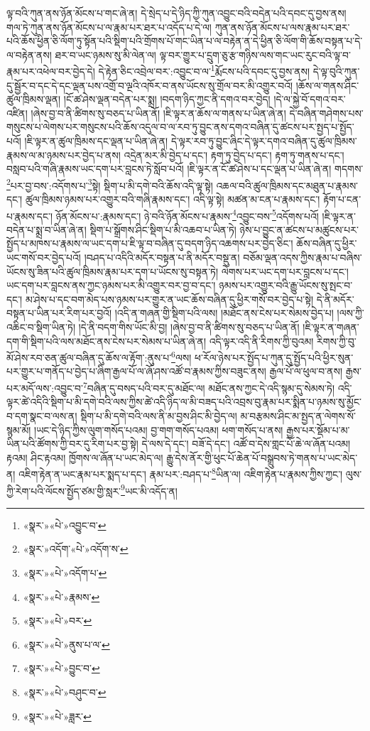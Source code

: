 ལྟ་བའི་ཀུན་ནས་ཉོན་མོངས་པ་གང་ཞེ་ན། དེ་སྲེད་པ་དེ་ཉིད་ཀྱི་ཀུན་འབྱུང་བའི་བདེན་པའི་དབང་དུ་བྱས་ནས། གལ་ཏེ་ཀུན་ནས་ཉོན་མོངས་པ་ལ་རྣམ་པར་ཐར་པ་འདོད་པ་དེ་ལ། ཀུན་ནས་ཉོན་མོངས་པ་ལས་རྣམ་པར་ཐར་པའི་ཆོས་ཕྱིན་ཅི་ལོག་ཏུ་སྟོན་པའི་སྡིག་པའི་གྲོགས་པོ་གང་ཡིན་པ་ལ་བརྟེན་ན་དེ་ཕྱིན་ཅི་ལོག་གི་ཆོས་བསྟན་པ་དེ་ལ་བརྟེན་ནས། ཐར་བ་ཡང་ཉམས་སུ་མི་ལེན་ལ། ལྟ་བར་གྱུར་པ་དྲུག་ཅུ་རྩ་གཉིས་ལས་གང་ཡང་རུང་བའི་ལྟ་བ་རྣམ་པར་འཕེལ་བར་བྱེད་དེ། དེ་རྟེན་ཅིང་འབྲེལ་བར་:འབྱུང་བ་ལ་\footnote{«སྣར་»«པེ་»འབྱུང་བ་}རྨོངས་པའི་དབང་དུ་བྱས་ནས། དེ་ལྟ་བུའི་ཀུན་དུ་སྦྱོར་བ་དང་དེ་དང་ལྡན་པས་འགྲོ་བ་ལྔའི་འཁོར་བ་ནས་ཡོངས་སུ་གྲོལ་བར་མི་འགྱུར་བའོ། །ཆོས་ལ་གནས་ཤིང་ཚུལ་ཁྲིམས་ལྡན། །ངོ་ཚ་ཤེས་ལྡན་བདེན་པར་སྨྲ། །བདག་ཉིད་ཀྱང་ནི་དགའ་བར་བྱེད། །དེ་ལ་སྐྱེ་བོ་དགའ་བར་འཛིན། །ཞེས་བྱ་བ་ནི་ཚིགས་སུ་བཅད་པ་ཡིན་ནོ། །ཇི་ལྟར་ན་ཆོས་ལ་གནས་པ་ཡིན་ཞེ་ན། དེ་བཞིན་གཤེགས་པས་གསུངས་པ་ལེགས་པར་གསུངས་པའི་ཆོས་འདུལ་བ་ལ་རབ་ཏུ་བྱུང་ནས་དགའ་བཞིན་དུ་ཚངས་པར་སྤྱད་པ་སྤྱོད་པའོ། །ཇི་ལྟར་ན་ཚུལ་ཁྲིམས་དང་ལྡན་པ་ཡིན་ཞེ་ན། དེ་ལྟར་རབ་ཏུ་བྱུང་ཞིང་དེ་ལྟར་དགའ་བཞིན་དུ་ཚུལ་ཁྲིམས་རྣམས་ལ་མ་ཉམས་པར་བྱེད་པ་ནས། འདྲེན་མར་མི་བྱེད་པ་དང་། རྟག་ཏུ་བྱེད་པ་དང་། རྟག་ཏུ་གནས་པ་དང་། བསླབ་པའི་གཞི་རྣམས་ཡང་དག་པར་བླངས་ཏེ་སློབ་པའོ། །ཇི་ལྟར་ན་ངོ་ཚ་ཤེས་པ་དང་ལྡན་པ་ཡིན་ཞེ་ན། གདགས་\footnote{«སྣར་»འདོག་«པེ་»འདོག་ས་}པར་བྱ་བས་:འདོགས་པ་\footnote{«སྣར་»«པེ་»འདོག་པ་}སྟེ། སྡིག་པ་མི་དགེ་བའི་ཆོས་འདི་ལྟ་སྟེ། འཆལ་བའི་ཚུལ་ཁྲིམས་དང་མཐུན་པ་རྣམས་དང་། ཚུལ་ཁྲིམས་ཉམས་པར་འགྱུར་བའི་གཞི་རྣམས་དང་། འདི་ལྟ་སྟེ། མཚན་མ་ངན་པ་རྣམས་དང་། རྟོག་པ་ངན་པ་རྣམས་དང་། ཉོན་མོངས་པ་:རྣམས་དང་། ཉེ་བའི་ཉོན་མོངས་པ་རྣམས་\footnote{«སྣར་»«པེ་»རྣམས་}འབྱུང་བས་\footnote{«སྣར་»«པེ་»བར་}འདོགས་པའོ། །ཇི་ལྟར་ན་བདེན་པ་སྨྲ་བ་ཡིན་ཞེ་ན། སྡིག་པ་སྒྲོགས་ཤིང་སྡིག་པ་མི་འཆབ་པ་ཡིན་ཏེ། ཉེས་པ་བྱུང་ན་ཚངས་པ་མཚུངས་པར་སྤྱོད་པ་མཁས་པ་རྣམས་ལ་ཡང་དག་པ་ཇི་ལྟ་བ་བཞིན་དུ་བདག་ཉིད་འཆགས་པར་བྱེད་ཅིང་། ཆོས་བཞིན་དུ་ཕྱིར་ཡང་གསོ་བར་བྱེད་པའོ། །བཤད་པ་འདིའི་མདོར་བསྟན་པ་ནི་མདོར་བསྡུ་ན། བཅོམ་ལྡན་འདས་ཀྱིས་རྣམ་པ་བཞིས་ཡོངས་སུ་ཟིན་པའི་ཚུལ་ཁྲིམས་རྣམ་པར་དག་པ་ཡོངས་སུ་བསྟན་ཏེ། ལེགས་པར་ཡང་དག་པར་བླངས་པ་དང་། ཡང་དག་པར་བླངས་ནས་ཀྱང་ཉམས་པར་མི་འགྱུར་བར་བྱ་བ་དང་། ཉམས་པར་འགྱུར་བའི་རྒྱུ་ཡོངས་སུ་སྤང་བ་དང་། མ་ཤེས་པ་དང་བག་མེད་པས་ཉམས་པར་གྱུར་ན་ཡང་ཆོས་བཞིན་དུ་ཕྱིར་གསོ་བར་བྱེད་པ་སྟེ། དེ་ནི་མདོར་བསྟན་པ་ཡིན་པར་རིག་པར་བྱའོ། །འདི་ན་གཞན་གྱི་སྡིག་པའི་ལས། །མཐོང་ནས་ངེས་པར་སེམས་བྱེད་པ། །ལས་ཀྱི་འཆིང་བ་སྡིག་ཡིན་ཏེ། །དེ་ནི་བདག་གིས་ཡོང་མི་བྱ། །ཞེས་བྱ་བ་ནི་ཚིགས་སུ་བཅད་པ་ཡིན་ནོ། །ཇི་ལྟར་ན་གཞན་དག་གི་སྡིག་པའི་ལས་མཐོང་ནས་ངེས་པར་སེམས་པ་ཡིན་ཞེ་ན། འདི་ལྟར་འདི་ནི་རིགས་ཀྱི་བུའམ། རིགས་ཀྱི་བུ་མོ་ཤེས་རབ་ཅན་ཚུལ་བཞིན་དུ་ཆོས་ལ་རྟོག་:ནུས་པ་\footnote{«སྣར་»«པེ་»ནུས་པ་ལ་}ལས། ཕ་རོལ་ཉེས་པར་སྤྱོད་པ་ཀུན་དུ་སྤྱོད་པའི་ཕྱིར་སུན་པར་གྱུར་པ་གནོད་པ་བྱེད་པ་ཞིག་རྒྱལ་པོ་ལ་ཞོ་ཤས་འཚོ་བ་རྣམས་ཀྱིས་བཟུང་ནས། རྒྱལ་པོ་ལ་ཕུལ་བ་ནས། རྒྱས་པར་མདོ་ལས་:འབྱུང་བ་\footnote{«སྣར་»«པེ་»བྱུང་བ་}བཞིན་དུ་བསད་པའི་བར་དུ་མཐོང་ལ། མཐོང་ནས་ཀྱང་དེ་འདི་སྙམ་དུ་སེམས་ཏེ། འདི་ལྟར་ཚེ་འདིའི་སྡིག་པ་མི་དགེ་བའི་ལས་ཀྱིས་ཚེ་འདི་ཉིད་ལ་མི་བཟད་པའི་འབྲས་བུ་རྣམ་པར་སྨིན་པ་ཉམས་སུ་མྱོང་བ་དག་སྣང་བ་ལས་ན། སྡིག་པ་མི་དགེ་བའི་ལས་ནི་མ་བྱས་ཤིང་མི་བྱེད་ལ། མ་བརྩམས་ཤིང་མ་སྤྱད་ན་ལེགས་སོ་སྙམ་མོ། །ཡང་དེ་ཉིད་ཀྱིས་ལུག་གསོད་པའམ། བྱ་གག་གསོད་པའམ། ཕག་གསོད་པ་ནས། རྒྱས་པར་སྡོམ་པ་མ་ཡིན་པའི་ཚོགས་ཀྱི་བར་དུ་རིག་པར་བྱ་སྟེ། དེ་ལས་དེ་དང་། བཟོ་དེ་དང་། འཚོ་བ་དེས་གླང་པོ་ཆེ་ལ་ཞོན་པའམ། རྟའམ། ཤིང་རྟའམ། ཁྱོགས་ལ་ཞོན་པ་ཡང་མེད་ལ། རྒྱུ་དེས་ནོར་གྱི་ཕུང་པོ་ཆེན་པོ་བསྒྲུབས་ཏེ་གནས་པ་ཡང་མེད་ན། འཇིག་རྟེན་ན་ཡང་རྣམ་པར་སྨད་པ་དང་། རྣམ་པར་:བཤད་པ་\footnote{«སྣར་»«པེ་»བཤུང་བ་}ཡིན་ལ། འཇིག་རྟེན་པ་རྣམས་ཀྱིས་ཀྱང་། ལུས་ཀྱི་རེག་པའི་ལོངས་སྤྱོད་ཙམ་གྱི་སླར་\footnote{«སྣར་»«པེ་»ཟླར་}ཡང་མི་འདོད་ན། 